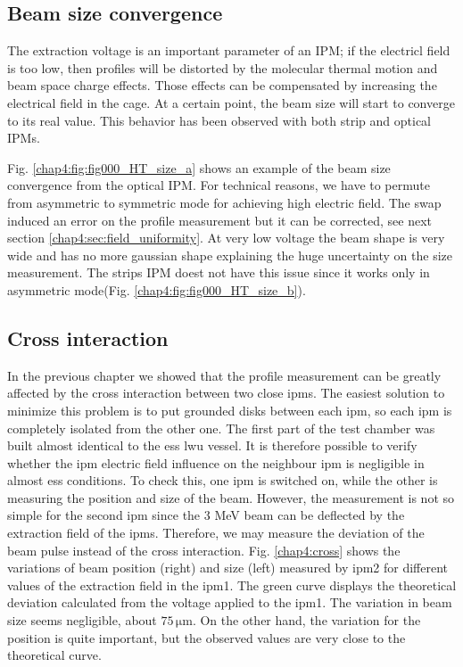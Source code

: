 \begin{refsection}
  \subsection{Beam size convergence}

  The extraction voltage is an important parameter of an IPM; if the electricl field is too low, then profiles will be distorted by the molecular thermal motion and beam space charge effects. Those effects can be compensated by increasing the electrical field in the cage. At a certain point, the beam size will start to converge to its real value. This behavior has been observed with both strip and optical IPMs.
  

  Fig. \ref{chap4:fig:fig000_HT_size_a} shows an example of the beam size convergence from the optical IPM. For technical reasons, we have to permute from asymmetric to symmetric mode for achieving high electric field. The swap induced an error on the profile measurement but it can be corrected, see next section \ref{chap4:sec:field_uniformity}. At very low voltage the beam shape is very wide and has no more gaussian shape explaining the huge uncertainty on the size measurement. The strips IPM doest not have this issue since it works only in asymmetric mode(Fig. \ref{chap4:fig:fig000_HT_size_b}).

  \subsection{Cross interaction }

  In the previous chapter we showed that the profile measurement can be greatly affected by the cross interaction between two close \acrshort{ipm}s. The easiest solution to minimize this problem is to put grounded disks between each \acrshort{ipm}, so each \acrshort{ipm} is completely isolated from the other one. The first part of the test chamber was built almost identical to the \acrshort{ess} \acrshort{lwu} vessel. It is therefore possible to verify whether the \acrshort{ipm} electric field influence on the neighbour \acrshort{ipm}  is negligible in almost \acrshort{ess} conditions. To check this, one \acrshort{ipm} is switched on, while the other is measuring the position and size of the beam. However, the measurement is not so simple for the second \acrshort{ipm} since the 3 MeV beam can be deflected by the extraction field of the \acrshort{ipm}s. Therefore, we may measure the deviation of the beam pulse instead of the cross interaction. Fig. \ref{chap4:cross} shows the variations of beam position (right) and size (left) measured by \acrshort{ipm}2 for different values of the extraction field in the \acrshort{ipm}1. The green curve displays the theoretical deviation calculated from the voltage applied to the \acrshort{ipm}1. The variation in beam size seems negligible, about $75\,\mathrm{\mu m}$. On the other hand, the variation for the position is quite important, but the observed values are very close to the theoretical curve.


\end{refsection}
